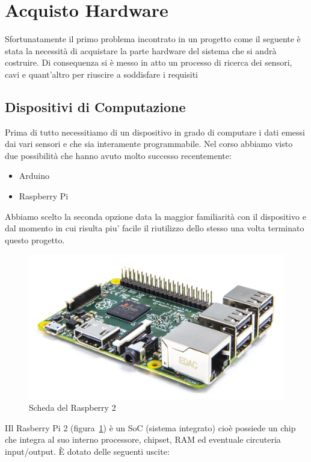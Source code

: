 \section{Acquisto Hardware}

Sfortunatamente il primo problema incontrato in un progetto come il seguente \`e stata la necessit\`a di acquistare la parte hardware del sistema che si andr\` a costruire. Di consequenza si \`e messo in atto un processo di ricerca dei sensori, cavi e quant'altro per riuscire a soddisfare i requisiti

\subsection{Dispositivi di Computazione}

Prima di tutto necessitiamo di un dispositivo in grado di computare i dati emessi dai vari sensori e che sia interamente programmabile. Nel corso abbiamo visto due possibilit\`a che hanno avuto molto successo recentemente:

\begin{itemize}
  \item Arduino
  \item Raspberry Pi
\end{itemize}

Abbiamo scelto la seconda opzione data la maggior familiarit\`a con il dispositivo e dal momento in cui risulta piu' facile il riutilizzo dello stesso una volta terminato questo progetto.

\begin{figure}
	\centering
	\includegraphics[width=0.7\linewidth]{Figures/Sensors&Rasp/Pi2}
	\caption[raspberry]{Scheda del Raspberry 2}
	\label{fig:Pi2}
\end{figure}

IIl Rasberry Pi 2 (figura~\ref{fig:Pi2}) è un SoC (sistema integrato) cio\`e possiede un chip che integra al suo interno processore, chipset, RAM ed eventuale circuteria input/output. \`E dotato delle seguenti uscite:

